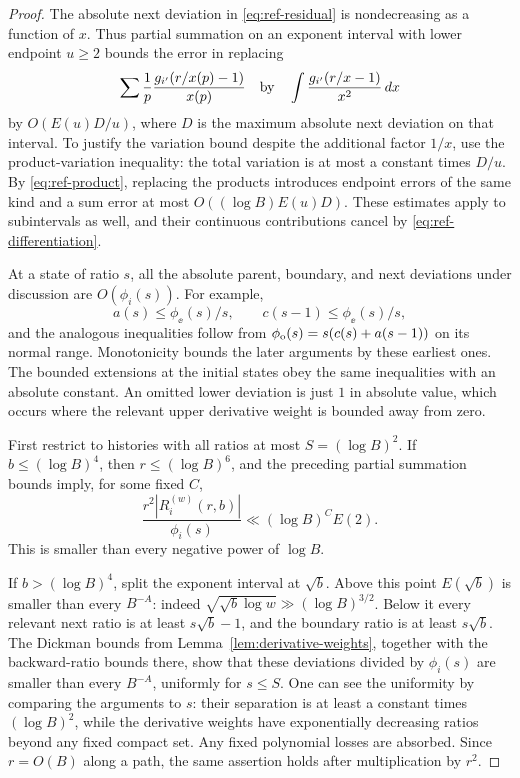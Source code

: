 \begin{proof}
The absolute next deviation in \eqref{eq:ref-residual} is nondecreasing
as a function of $x$.  Thus partial summation on an exponent interval
with lower endpoint $u\geq2$ bounds the error in replacing
\[
 \sum\frac1p\frac{g_{i'}(r/x(p)-1)}{x(p)}
 \quad\hbox{by}\quad
 \int\frac{g_{i'}(r/x-1)}{x^2}\,dx
\]
by $O(E(u)D/u)$, where $D$ is the maximum absolute next deviation on
that interval.  To justify the variation bound despite the additional
factor $1/x$, use the product-variation inequality: the total variation
is at most a constant times $D/u$.  By \eqref{eq:ref-product}, replacing
the products introduces endpoint errors of the same kind and a sum
error at most $O((\log B)E(u)D)$.  These estimates apply to subintervals
as well, and their continuous contributions cancel by
\eqref{eq:ref-differentiation}.

At a state of ratio $s$, all the absolute parent, boundary, and next
deviations under discussion are $O(\phi_i(s))$.  For example,
\[
 a(s)\leq\phi_\ee(s)/s,\qquad
 c(s-1)\leq\phi_\ee(s)/s,
\]
and the analogous inequalities follow from
$\phi_\mathrm o(s)=s(c(s)+a(s-1))$ on its normal range.  Monotonicity bounds
the later arguments by these earliest ones.  The bounded extensions
at the initial states obey the same inequalities with an absolute
constant.  An omitted lower deviation is just $1$ in absolute value,
which occurs where the relevant upper derivative weight is bounded
away from zero.

First restrict to histories with all ratios at most
$S=(\log B)^2$.  If $b\leq(\log B)^4$, then $r\leq(\log B)^6$, and
the preceding partial summation bounds imply, for some fixed $C$,
\begin{equation}\label{eq:ref-small-cutoff-error}
 \frac{r^2|R_i^{(w)}(r,b)|}{\phi_i(s)}
       \ll(\log B)^C E(2).
\end{equation}
This is smaller than every negative power of $\log B$.

If $b>(\log B)^4$, split the exponent interval at $\sqrt b$.  Above
this point $E(\sqrt b)$ is smaller than every $B^{-A}$: indeed
$\sqrt{\sqrt b\log w}\gg(\log B)^{3/2}$.  Below it every relevant
next ratio is at least $s\sqrt b-1$, and the boundary ratio is at
least $s\sqrt b$.  The Dickman bounds from
Lemma~\ref{lem:derivative-weights}, together with the backward-ratio
bounds there, show that these deviations divided by $\phi_i(s)$
are smaller than every $B^{-A}$, uniformly for $s\leq S$.  One can see
the uniformity by comparing the arguments to $s$: their separation
is at least a constant times $(\log B)^2$, while the derivative weights
have exponentially decreasing ratios beyond any fixed compact set.
Any fixed polynomial losses are absorbed.  Since $r=O(B)$ along a
path, the same assertion holds after multiplication by $r^2$.


\end{proof}

